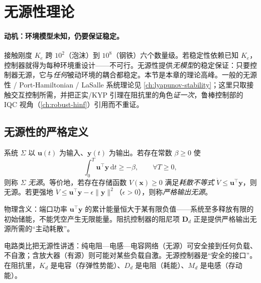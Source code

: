 \section{无源性理论}
\label{sec:os-passivity}

\paragraph{动机：环境模型未知，仍要保证稳定。}
接触刚度 $K_e$ 跨 $10^2$（泡沫）到 $10^8$（钢铁）六个数量级。若稳定性依赖已知 $K_e$，控制器就得为每种环境重设计——不可行。无源性提供\emph{无模型}的稳定保证：只要控制器无源，它与\emph{任何}被动环境的耦合都稳定。本节是本章的理论高峰。一般的无源性 / Port-Hamiltonian / LaSalle 系统理论见 \cref{ch:lyapunov-stability}；这里只取接触交互控制所需，并把正实/KYP 引理在阻抗里的角色\emph{证一次}，鲁棒控制部的 IQC 视角（\cref{ch:robust-hinf}）引用而不重证。

\subsection{无源性的严格定义}
\label{sec:os-passivity-def}

\begin{definition}[输入—输出无源与严格输出无源]
\label{def:os-passivity}
系统 $\Sigma$ 以 $\mathbf u(t)$ 为输入、$\mathbf y(t)$ 为输出。若存在常数 $\beta\ge0$ 使
\begin{equation}
  \int_0^T\mathbf u^\top\mathbf y\,\mathrm dt\ge-\beta,\qquad\forall T\ge0,
  \label{eq:os-passive-integral}
\end{equation}
则称 $\Sigma$ \emph{无源}。等价地，若存在存储函数 $V(\mathbf x)\ge0$ 满足\emph{耗散不等式} $\dot V\le\mathbf u^\top\mathbf y$，则无源。若更强地 $\dot V\le\mathbf u^\top\mathbf y-\epsilon\|\mathbf y\|^2$（$\epsilon>0$），则称\emph{严格输出无源}。
\end{definition}

物理含义：端口功率 $\mathbf u^\top\mathbf y$ 的累计能量恒大于某有限负值——系统至多释放有限的初始储能，不能凭空产生无限能量。阻抗控制器的阻尼项 $\mathbf D_d$ 正是提供严格输出无源所需的“主动耗散”。

\begin{insight}
电路类比把无源性讲透：纯电阻—电感—电容网络（无源）可安全接到任何负载、不自激；含放大器（有源）则可能对某些负载自激。无源控制器是“安全的接口”。在阻抗里，$K_d$ 是电容（存弹性势能）、$D_d$ 是电阻（耗能）、$M_d$ 是电感（存动能）。
\end{insight}

